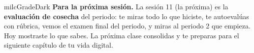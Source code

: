 \documentclass[11pt,letterpaper]{article}
\begin{document}
\begin{infoband}{milcGradeDark}
\textbf{Para la próxima sesión.} La sesión 11 (la próxima) es la \textbf{evaluación de cosecha} del periodo: te miras todo lo que hiciste, te autoevalúas con rúbrica, vemos el examen final del periodo, y miras al periodo 2 que empieza. Hoy mostraste lo que sabes. La próxima clase consolidas y te preparas para el siguiente capítulo de tu vida digital.
\end{infoband}
\end{document}
